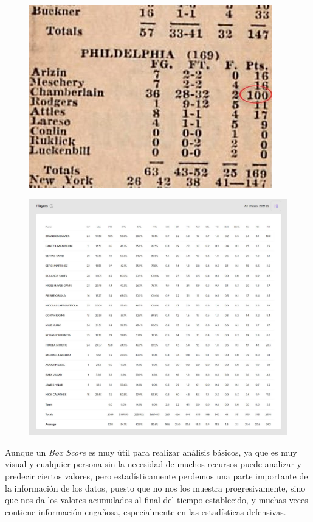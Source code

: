 \documentclass[paper=a4, fontsize=9pt]{article}
\begin{document}
\begin{figure}[H]
\centering
\begin{minipage}{.5\textwidth}
\centering
\captionsetup{width=.8\linewidth}
\includegraphics[width=.8\linewidth]{imagenes/BoxScore1962.jpg}
\label{fig:BoxScore1962}
\end{minipage}%
\begin{minipage}{.5\textwidth}
\centering
\captionsetup{width=.8\linewidth}
\includegraphics[width=.7\linewidth]{imagenes/BoxScore2022.jpg}
\label{fig:BoxScore2022}
\end{minipage}
\end{figure}

Aunque un \emph{Box Score} es muy útil para realizar análisis básicos, ya que es muy visual y cualquier persona sin la necesidad de muchos recursos puede analizar y predecir ciertos valores, pero estadísticamente perdemos una parte importante de la información de los datos, puesto que no nos los muestra progresivamente, sino que nos da los valores acumulados al final del tiempo establecido, y muchas veces contiene información engañosa, especialmente en las estadísticas defensivas.
\end{document}
